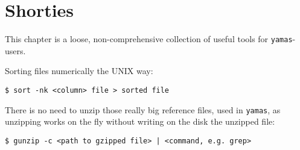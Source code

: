\chapter{Shorties}

This chapter is a loose, non-comprehensive collection of useful tools for \verb+yamas+-users.

Sorting files numerically the UNIX way:
\begin{lstlisting}[style=shell]
$ sort -nk <column> file > sorted file
\end{lstlisting}

There is no need to unzip those really big reference files, used in \verb+yamas+, as
unzipping works on the fly without writing on the disk the unzipped file:
\begin{lstlisting}[style=shell]
$ gunzip -c <path to gzipped file> | <command, e.g. grep>
\end{lstlisting}
